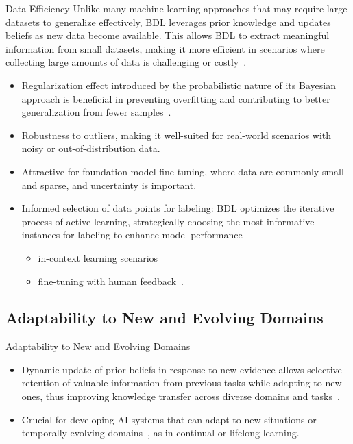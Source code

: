 \documentclass[9pt,handout]{beamer}
\begin{document}
\begin{frame}{Data Efficiency}
Unlike many machine learning approaches that may require large datasets to generalize effectively, BDL leverages \alert{prior knowledge} and updates beliefs as new data become available. This allows BDL to extract meaningful information from \alert{small datasets}, making it more efficient in scenarios where \alert{collecting large amounts of data is challenging or costly}~\citep{finzi2021residual,immer2022invariance,shwartz2022,schwobel2022last,van2023learning}.

\begin{itemize}[<+->]
	\item \alert{Regularization} effect introduced by the probabilistic nature of its Bayesian approach is beneficial in \alert{preventing overfitting} and contributing to better \alert{generalization} from fewer samples~\citep{rothfuss2022pac, sharma2023incorporating}.
	\item \alert{Robustness to outliers}, making it well-suited for real-world scenarios with noisy or out-of-distribution data. 
	\item Attractive for \alert{foundation model fine-tuning}, where data are commonly small and sparse, and uncertainty is important.
	\item Informed selection of data points for labeling: BDL optimizes the iterative process of \alert{active learning}, strategically choosing the most informative instances for labeling to enhance model performance~\citep{galAL2017}
	\begin{itemize}
		\item in-context learning scenarios~\citep{margatina-etal-2023-active} 
		\item fine-tuning with human feedback~\citep{casper2023open}.	
	\end{itemize}
\end{itemize}
\end{frame} 

\subsection{Adaptability to New and Evolving Domains}

\begin{frame}{Adaptability to New and Evolving Domains}
\begin{itemize}[<+->]
	\item \alert{Dynamic update of prior beliefs} in response to new evidence allows selective retention of valuable information from previous tasks while adapting to new ones, thus improving \alert{knowledge transfer} across diverse domains and tasks~\citep{rothfuss2021pacoh,rothfuss2022pac,rudner2023uap}. 
	\item Crucial for developing AI systems that can adapt to new situations or temporally evolving domains~\citep{nguyen2018variational,rudner2022sfsvi}, as in \alert{continual or lifelong learning}. 
\end{itemize}
\end{frame}
\end{document}

